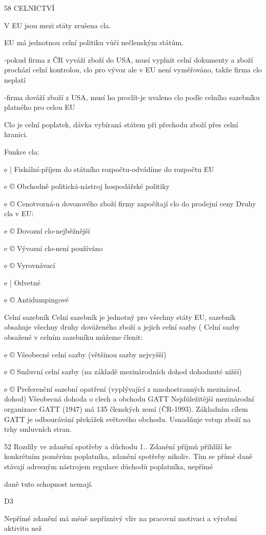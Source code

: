 58
\newpage
CELNICTVÍ

V EU jsou mezi státy zrušena cla.

EU má jednotnou celní politiku vůči nečlenským státům.

-pokud firma z ČR vyváží zboží do USA, musí vyplnit celní dokumenty a zboží
prochází celní kontrolou, clo pro vývoz ale v EU není vyměřováno, takže firma
clo neplatí

-firma dováží zboží z USA, musí ho proclít-je uvaleno clo podle celního sazebníku
platného pro celou EU

Clo je celní poplatek, dávka vybíraná státem při přechodu zboží přes celní hranici.

Funkce cla:

e | Fiskální-příjem do státního rozpočtu-odvádíme do rozpočtu EU

e © Obchodně politická-nástroj hospodářské politiky

e © Cenotvorná-u dovozového zboží firmy započítají clo do prodejní ceny
Druhy cla v EU:

e © Dovozní clo-nejběžnější

e © Vývozní clo-není používáno

e © Vyrovnávací

e | Odvetné

e © Antidumpingové

Celní sazebník
Celní sazebník je jednotný pro všechny státy EU, sazebník obsahuje všechny druhy
dováženého zboží a jejich celní sazby (%
Celní sazby obsažené v celním sazebníku můžeme členit:

e © Všeobecné celní sazby (většinou sazby nejvyšší)

e © Smluvní celní sazby (na základě mezinárodních dohod dohodnuté nižší)

e © Preferenční sazební opatření (vyplývající z mnohostranných mezinárod. dohod)
Všeobecná dohoda o clech a obchodu GATT
Nejdůležitější mezinárodní organizace GATT (1947) má 135 členských zemí (ČR-1993).
Základním cílem GATT je odbourávání překážek světového obchodu.
Usnadňuje vstup zboží na trhy smluvních stran.

52
\newpage
Rozdíly ve zdanění spotřeby a důchodu
1.. Zdanění příjmů přihlíží ke konkrétním poměrům poplatníka, zdanění spotřeby nikoliv.
Tím se přímé daně stávají adresným nástrojem regulace důchodů poplatníka, nepřímé

daně tuto schopnost nemají.

D3

Nepřímé zdanění má méně nepříznivý vliv na pracovní motivaci a výrobní aktivitu než

